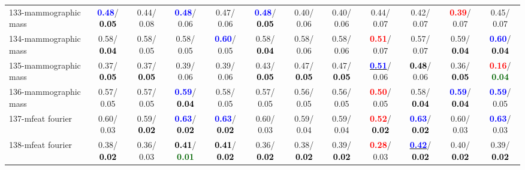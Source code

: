 \begin{table}[h]
\begin{center}
{\begin{tabular}{lc|c|c|c|c|c|c|c|c|c|c}
133-mammographic mass & \textcolor{blue}{\textbf{  0.48}}/\textcolor{black}{\textbf{  0.05}} &   0.44/  0.08 & \textcolor{blue}{\textbf{  0.48}}/  0.06 &   0.47/  0.06 & \textcolor{blue}{\textbf{  0.48}}/\textcolor{black}{\textbf{  0.05}} &   0.40/  0.06 &   0.40/  0.06 &   0.44/  0.07 &   0.42/  0.07 & \textcolor{red}{\textbf{  0.39}}/  0.07 &   0.45/  0.07 \\
134-mammographic mass &   0.58/\textcolor{black}{\textbf{  0.04}} &   0.58/  0.05 &   0.58/  0.05 & \textcolor{blue}{\textbf{  0.60}}/  0.05 &   0.58/\textcolor{black}{\textbf{  0.04}} &   0.58/  0.06 &   0.58/  0.06 & \textcolor{red}{\textbf{  0.51}}/  0.07 &   0.57/  0.07 &   0.59/\textcolor{black}{\textbf{  0.04}} & \textcolor{blue}{\textbf{  0.60}}/\textcolor{black}{\textbf{  0.04}} \\
135-mammographic mass &   0.37/\textcolor{black}{\textbf{  0.05}} &   0.37/\textcolor{black}{\textbf{  0.05}} &   0.39/  0.06 &   0.39/  0.06 &   0.43/\textcolor{black}{\textbf{  0.05}} &   0.47/\textcolor{black}{\textbf{  0.05}} &   0.47/\textcolor{black}{\textbf{  0.05}} & \underline{\textcolor{blue}{\textbf{  0.51}}}/  0.06 & \textcolor{black}{\textbf{  0.48}}/  0.06 &   0.36/\textcolor{black}{\textbf{  0.05}} & \textcolor{red}{\textbf{  0.16}}/\textcolor{darkgreen}{\textbf{  0.04}} \\ \hline
136-mammographic mass &   0.57/  0.05 &   0.57/  0.05 & \textcolor{blue}{\textbf{  0.59}}/\textcolor{black}{\textbf{  0.04}} &   0.58/  0.05 &   0.57/  0.05 &   0.56/  0.05 &   0.56/  0.05 & \textcolor{red}{\textbf{  0.50}}/  0.05 &   0.58/\textcolor{black}{\textbf{  0.04}} & \textcolor{blue}{\textbf{  0.59}}/\textcolor{black}{\textbf{  0.04}} & \textcolor{blue}{\textbf{  0.59}}/  0.05 \\
137-mfeat fourier &   0.60/  0.03 &   0.59/\textcolor{black}{\textbf{  0.02}} & \textcolor{blue}{\textbf{  0.63}}/\textcolor{black}{\textbf{  0.02}} & \textcolor{blue}{\textbf{  0.63}}/\textcolor{black}{\textbf{  0.02}} &   0.60/  0.03 &   0.59/  0.04 &   0.59/  0.04 & \textcolor{red}{\textbf{  0.52}}/\textcolor{black}{\textbf{  0.02}} & \textcolor{blue}{\textbf{  0.63}}/\textcolor{black}{\textbf{  0.02}} &   0.60/  0.03 & \textcolor{blue}{\textbf{  0.63}}/  0.03 \\
138-mfeat fourier &   0.38/\textcolor{black}{\textbf{  0.02}} &   0.36/  0.03 & \textcolor{black}{\textbf{  0.41}}/\textcolor{darkgreen}{\textbf{  0.01}} & \textcolor{black}{\textbf{  0.41}}/\textcolor{black}{\textbf{  0.02}} &   0.36/\textcolor{black}{\textbf{  0.02}} &   0.38/\textcolor{black}{\textbf{  0.02}} &   0.39/\textcolor{black}{\textbf{  0.02}} & \textcolor{red}{\textbf{  0.28}}/  0.03 & \underline{\textcolor{blue}{\textbf{  0.42}}}/\textcolor{black}{\textbf{  0.02}} &   0.40/\textcolor{black}{\textbf{  0.02}} &   0.39/\textcolor{black}{\textbf{  0.02}} \\

\end{tabular}}
\end{center}
\end{table}
